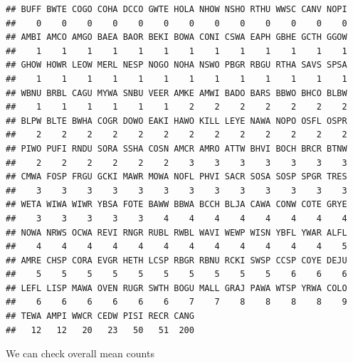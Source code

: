 \documentclass[12pt,]{book}
\newenvironment{Shaded}{\begin{snugshade}}{\end{snugshade}}
\newcommand{\CommentTok}[1]{\textcolor[rgb]{0.56,0.35,0.01}{\textit{#1}}}
\newcommand{\DecValTok}[1]{\textcolor[rgb]{0.00,0.00,0.81}{#1}}
\newcommand{\KeywordTok}[1]{\textcolor[rgb]{0.13,0.29,0.53}{\textbf{#1}}}
\newcommand{\NormalTok}[1]{#1}
\newcommand{\OperatorTok}[1]{\textcolor[rgb]{0.81,0.36,0.00}{\textbf{#1}}}
\newcommand{\StringTok}[1]{\textcolor[rgb]{0.31,0.60,0.02}{#1}}
\begin{document}
\begin{verbatim}
## BUFF BWTE COGO COHA DCCO GWTE HOLA NHOW NSHO RTHU WWSC CANV NOPI 
##    0    0    0    0    0    0    0    0    0    0    0    0    0 
## AMBI AMCO AMGO BAEA BAOR BEKI BOWA CONI CSWA EAPH GBHE GCTH GGOW 
##    1    1    1    1    1    1    1    1    1    1    1    1    1 
## GHOW HOWR LEOW MERL NESP NOGO NOHA NSWO PBGR RBGU RTHA SAVS SPSA 
##    1    1    1    1    1    1    1    1    1    1    1    1    1 
## WBNU BRBL CAGU MYWA SNBU VEER AMKE AMWI BADO BARS BBWO BHCO BLBW 
##    1    1    1    1    1    1    2    2    2    2    2    2    2 
## BLPW BLTE BWHA COGR DOWO EAKI HAWO KILL LEYE NAWA NOPO OSFL OSPR 
##    2    2    2    2    2    2    2    2    2    2    2    2    2 
## PIWO PUFI RNDU SORA SSHA COSN AMCR AMRO ATTW BHVI BOCH BRCR BTNW 
##    2    2    2    2    2    2    3    3    3    3    3    3    3 
## CMWA FOSP FRGU GCKI MAWR MOWA NOFL PHVI SACR SOSA SOSP SPGR TRES 
##    3    3    3    3    3    3    3    3    3    3    3    3    3 
## WETA WIWA WIWR YBSA FOTE BAWW BBWA BCCH BLJA CAWA CONW COTE GRYE 
##    3    3    3    3    3    4    4    4    4    4    4    4    4 
## NOWA NRWS OCWA REVI RNGR RUBL RWBL WAVI WEWP WISN YBFL YWAR ALFL 
##    4    4    4    4    4    4    4    4    4    4    4    4    5 
## AMRE CHSP CORA EVGR HETH LCSP RBGR RBNU RCKI SWSP CCSP COYE DEJU 
##    5    5    5    5    5    5    5    5    5    5    6    6    6 
## LEFL LISP MAWA OVEN RUGR SWTH BOGU MALL GRAJ PAWA WTSP YRWA COLO 
##    6    6    6    6    6    6    7    7    8    8    8    8    9 
## TEWA AMPI WWCR CEDW PISI RECR CANG 
##   12   12   20   23   50   51  200
\end{verbatim}

\begin{Shaded}
\end{Shaded}

We can check overall mean counts
\end{document}
